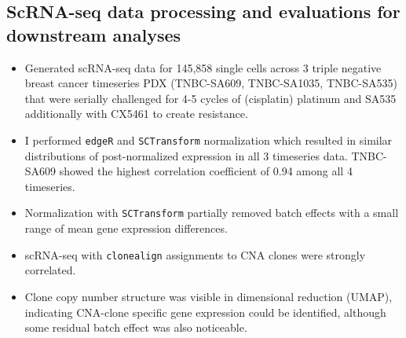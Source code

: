   
  \subsection{ScRNA-seq data processing and evaluations for downstream analyses} 
\begin{itemize}
  
   \item Generated scRNA-seq data for 145,858 single cells across 3 triple negative breast cancer timeseries PDX 
(TNBC-SA609, TNBC-SA1035, TNBC-SA535) that were serially challenged for 4-5 cycles of (cisplatin) platinum and SA535 additionally with CX5461 to create resistance.
   \item I performed  \texttt{edgeR} and \texttt{SCTransform}  normalization which resulted in similar distributions of post-normalized expression in all 3 timeseries data. TNBC-SA609 showed the highest correlation coefficient of 0.94 among all 4 timeseries.
 
 \item Normalization with \texttt{SCTransform} partially removed batch effects with a small range of mean gene expression differences.

 \item scRNA-seq with \texttt{clonealign} assignments to CNA clones were strongly correlated.
 
 \item Clone copy number structure was visible in dimensional reduction (UMAP), indicating CNA-clone specific gene expression could be identified, although some residual batch effect was also noticeable.

\end{itemize}
